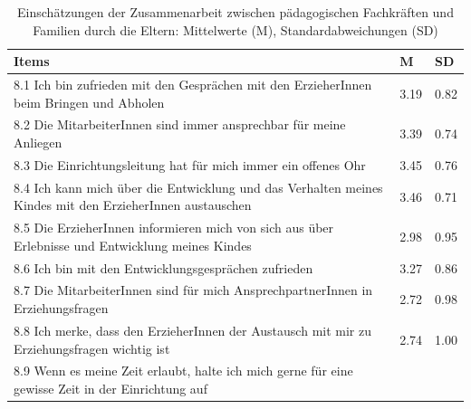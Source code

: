\documentclass[12pt,a4paper]{article}
\begin{document}
\begin{table}[h]
\label{tab_mean}
\caption{Einschätzungen der Zusammenarbeit zwischen pädagogischen Fachkräften und Familien durch die Eltern: Mittelwerte (M), Standardabweichungen (SD)}
\begin{tabularx}{\textwidth}{Xll}
\hline 
Items&
  M&
           SD\\\hline  
8.1 Ich bin zufrieden mit den Gesprächen mit den ErzieherInnen
      beim Bringen und Abholen                                                                                                                                                                                                             &
 3.19&  
           0.82   \\      
8.2 Die MitarbeiterInnen sind immer ansprechbar für meine   
      Anliegen                                                                                                                                                &
 3.39&
           0.74\\
8.3 Die Einrichtungsleitung hat für mich immer ein offenes Ohr &             
 3.45&
           0.76\\
8.4 Ich kann mich über die Entwicklung und das Verhalten
      meines Kindes mit den ErzieherInnen austauschen                                                                                             &
 3.46&
           0.71\\
8.5 Die ErzieherInnen informieren mich von sich aus über
      Erlebnisse und Entwicklung meines Kindes                                                                                                                                         &
 2.98&
           0.95\\
8.6 Ich bin mit den Entwicklungsgesprächen zufrieden                                          &
 3.27&
          0.86\\
8.7 Die MitarbeiterInnen sind für mich AnsprechpartnerInnen in             
      Erziehungsfragen                                                                                   &
 2.72&
          0.98\\
8.8 Ich merke, dass den ErzieherInnen der Austausch mit mir zu
      Erziehungsfragen wichtig ist                                                                 &
 2.74&
          1.00\\
8.9 Wenn es meine Zeit erlaubt, halte ich mich gerne für eine
      gewisse Zeit in der Einrichtung auf                                                                                                                  &

\end{tabularx}
\end{table}
\end{document}
